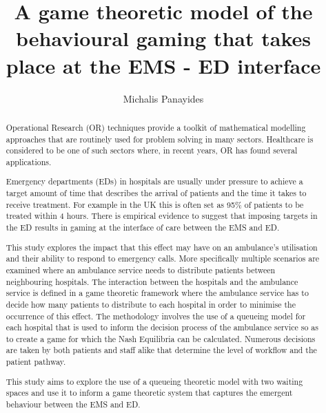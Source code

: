 \documentclass{article}
\title{A game theoretic model of the behavioural gaming that takes place at the 
EMS - ED interface}
\author{Michalis Panayides}
\begin{document}
\maketitle
\begin{abstract}
    
    Operational Research (OR) techniques provide a toolkit of mathematical 
    modelling approaches that are routinely used for problem solving in many
    sectors. Healthcare is considered to be one of such sectors where, in recent
    years, OR has found several applications.
    
    Emergency departments (EDs) in hospitals are usually under pressure to 
    achieve a target amount of time that describes the arrival of patients and 
    the time it takes to receive treatment. For example in the UK this is often 
    set as 95\% of patients to be treated within 4 hours. There is empirical 
    evidence to suggest that imposing targets in the ED results in gaming at the 
    interface of care between the EMS and ED. 

    This study explores the impact that this effect may have on an ambulance's 
    utilisation and their ability to respond to emergency calls. More 
    specifically multiple scenarios are examined where an ambulance service 
    needs to distribute patients between neighbouring hospitals. The interaction 
    between the hospitals and the ambulance service is defined in a game 
    theoretic framework where the ambulance service has to decide how many 
    patients to distribute to each hospital in order to minimise the occurrence 
    of this effect. The methodology involves the use of a queueing model for 
    each hospital that is used to inform the decision process of the ambulance 
    service so as to create a game for which the Nash Equilibria can be 
    calculated. Numerous decisions are taken by both patients and staff alike 
    that determine the level of workflow and the patient pathway.
    
    This study aims to explore the use of a queueing theoretic model with two 
    waiting spaces and use it to inform a game theoretic system that captures
    the emergent behaviour between the EMS and ED.
    
\end{abstract}
    
\end{document}
